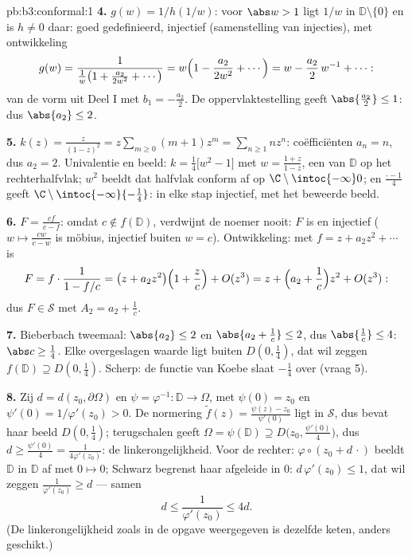\begin{solution}{pb:b3:conformal:1}
\textbf{4.} $g(w) = 1/h(1/w)$: voor $\abs w > 1$ ligt $1/w$ in
$\mathbb D\setminus\{0\}$ en is $h \neq 0$ daar: goed
gedefinieerd, injectief (samenstelling van injecties), met
ontwikkeling
\[
g(w) = \frac{1}{\frac1w\bigl(1 + \frac{a_2}{2w^2} +
\cdots\bigr)} = w\Bigl(1 - \frac{a_2}{2w^2} + \cdots\Bigr)
= w - \frac{a_2}{2}\,w^{-1} + \cdots :
\]
van de vorm uit Deel I met $b_1 = -\frac{a_2}2$. De
oppervlaktestelling geeft $\abs{\frac{a_2}2} \leq 1$: dus
$\abs{a_2} \leq 2$.

\textbf{5.} $k(z) = \frac z{(1-z)^2} = z\sum_{m\geq0}(m + 1)z^m =
\sum_{n\geq1}nz^n$: coëfficiënten $a_n = n$, dus $a_2 = 2$.
Univalentie en beeld: $k = \frac14\bigl[w^2 - 1\bigr]$ met $w =
\frac{1 + z}{1 - z}$, een  van $\mathbb D$ op
het rechterhalfvlak; $w^2$ beeldt dat halfvlak conform af op
$\C\setminus\intoc{-\infty}0$; en $\frac{\cdot - 1}4$ geeft
$\C\setminus\intoc{-\infty}{-\frac14}$: in elke stap injectief,
met het beweerde beeld.

\textbf{6.} $F = \frac{cf}{c - f}$: omdat $c \notin f(\mathbb
D)$, verdwijnt de noemer nooit: $F$ is  en injectief ($w
\mapsto \frac{cw}{c - w}$ is möbius, injectief buiten $w = c$).
Ontwikkeling: met $f = z + a_2z^2 + \cdots$ is
\[
F = f\cdot\frac1{1 - f/c} = \bigl(z + a_2z^2\bigr)\Bigl(1 +
\frac zc\Bigr) + O(z^3)
= z + \Bigl(a_2 + \frac1c\Bigr)z^2 + O(z^3):
\]
dus $F \in \mathcal S$ met $A_2 = a_2 + \frac1c$.

\textbf{7.} Bieberbach tweemaal: $\abs{a_2} \leq 2$ en $\abs{a_2
+ \frac1c} \leq 2$, dus $\abs{\frac1c} \leq 4$: $\abs c \geq
\frac14$. Elke overgeslagen waarde ligt buiten $D(0,\frac14)$,
dat wil zeggen $f(\mathbb D) \supseteq D(0, \frac14)$. Scherp: de
functie van Koebe slaat $-\frac14$ over (vraag 5).

\textbf{8.} Zij $d = d(z_0, \partial\Omega)$ en $\psi =
\varphi^{-1} \colon \mathbb D \to \Omega$, met $\psi(0) = z_0$ en
$\psi'(0) = 1/\varphi'(z_0) > 0$. De normering $\tilde f(z) =
\frac{\psi(z) - z_0}{\psi'(0)}$ ligt in $\mathcal S$, dus bevat
haar beeld $D(0, \frac14)$; terugschalen geeft $\Omega =
\psi(\mathbb D) \supseteq D\bigl(z_0, \tfrac{\psi'(0)}4\bigr)$,
dus $d \geq \frac{\psi'(0)}4 = \frac1{4\varphi'(z_0)}$: de
linkerongelijkheid. Voor de rechter: $\varphi\circ(z_0 + d\,\cdot)$
beeldt $\mathbb D$ in $\mathbb D$ af met $0 \mapsto 0$; Schwarz
begrenst haar afgeleide in $0$: $d\,\varphi'(z_0) \leq 1$, dat
wil zeggen $\frac1{\varphi'(z_0)} \geq d$ --- samen
\[
d \leq \frac1{\varphi'(z_0)} \leq 4d .
\]
(De linkerongelijkheid zoals in de opgave weergegeven is dezelfde
keten, anders geschikt.)


\end{solution}
